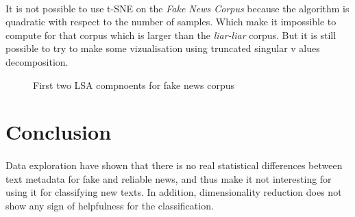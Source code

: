 \paragraph{} It is not possible to use t-SNE on the \textit{Fake News Corpus} because the algorithm is quadratic with respect to the number of samples. Which make it impossible to compute for that corpus which is larger than the \textit{liar-liar} corpus. But it is still possible to try to make some vizualisation using truncated singular v	alues decomposition.

\begin{figure}[h]
  \centering
  \caption{First two LSA compnoents for fake news corpus}
  \label{fig:data_explo:LSA1}
\end{figure}

\section{Conclusion}
\paragraph{} Data exploration have shown that there is no real statistical differences between text metadata for fake and reliable news, and thus make it not interesting for using it for classifying new texts. In addition, dimensionality reduction does not show any sign of helpfulness for the classification. 
